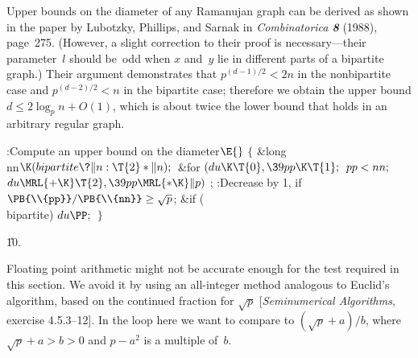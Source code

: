 Upper bounds on the diameter of any Ramanujan graph can be derived
as shown in the paper by Lubotzky, Phillips, and Sarnak in
{\sl Combinatorica \bf8} (1988), page~275. (However, a slight correction
to their proof is necessary---their parameter~$l$ should be~odd
when $x$ and~$y$ lie in different parts of a bipartite graph.)
Their argument demonstrates that $p^{(d-1)/2}<2n$ in the
nonbipartite case and $p^{(d-2)/2}<n$ in the bipartite case; therefore
we obtain the upper bound $d\le 2\log_p n+O(1)$, which is about twice the lower
bound that holds in an arbitrary regular graph.

\Y\B\4:Compute an upper bound  on the diameter\X${}\E{}$\6
${}\{{}$\5
\1\&{long} \\{nn}${}\K(\\{bipartite}\?\|n:\T{2}*\|n);{}$\7
\&{for} ${}(\\{du}\K\T{0},\39\\{pp}\K\T{1};{}$ ${}\\{pp}<\\{nn};{}$ ${}\\{du}%
\MRL{+{\K}}\T{2},\39\\{pp}\MRL{*{\K}}\|p){}$\1\5
;\2\6
:Decrease  by 1, if $\PB{\\{pp}}/\PB{\\{nn}}\ge\sqrt p$\X;\6
\&{if} (\\{bipartite})\1\5
${}\\{du}\PP;{}$\2\6
\4${}\}{}$\2\par
\U10.\fi

Floating point arithmetic might not be accurate enough for the test
required in this section. We avoid it by using an all-integer method
analogous to Euclid's algorithm, based on the continued fraction for
$\sqrt p$ [{\sl Seminumerical Algorithms}, exercise 4.5.3--12]. In the
loop here we want to compare  to $(\sqrt p+a)/b$, where $%
\sqrt p+a
>b>0$ and $p-a^2$ is a multiple of~$b$.

